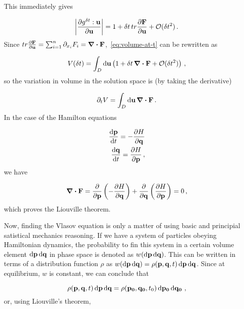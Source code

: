 \documentclass[12pt, class=report, crop=false]{standalone}
\begin{document}
This immediately gives

\begin{equation}
  \abs{\pdv{g^{\delta t}:\vb{u}}{\vb{u}}} = 1 + \delta t\, tr \pdv{\vb{F}}{\vb{u}}+\mathcal{O}(\delta t^2)\,.
\end{equation}
Since \(tr \pdv{\vb{F}}{\vb{u}} = \sum_{i=1}^n \partial_{x_i} F_i = \div{\vb{F}}\),~\cref{eq:volume-at-t} can be rewritten as

\begin{equation}
  V(\delta t) = \int_{D} \dd{\vb{u}} \left( 1+\delta t\, \div{\vb{F}} +\mathcal{O}(\delta t^2) \right)\,,
\end{equation}
so the variation in volume in the solution space is (by taking the derivative)

\begin{equation}
  \partial_t V = \int_{D} \dd{\vb{u}} \div{\vb{F}}\,.
\end{equation}
In the case of the Hamilton equations

\begin{subequations}
  \begin{align}
    \dv{\vb{p}}{t} = - \pdv{H}{\vb{q}}\\
    \dv{\vb{q}}{t} = \pdv{H}{\vb{p}}\,,
  \end{align}
\end{subequations}
we have

\begin{equation}
  \div{\vb{F}} = \pdv{\vb{p}} \left(- \pdv{H}{\vb{q}} \right) + \pdv{\vb{q}} \left(\pdv{H}{\vb{p}} \right) = 0\,,
\end{equation}
which proves the Liouville theorem.

Now, finding the Vlasov equation is only a matter of using basic and principial satistical mechanics reasoning. If we have a system of particles obeying Hamiltonian dynamics, the probability to fin this system in a certain volume element \(\dd{\vb{p}}\dd{\vb{q}}\) in phase space is denoted as \(w(\dd{\vb{p}}\dd{\vb{q}})\). This can be written in terms of a distribution function \(\rho\) as \(w (\dd{\vb{p}} \dd{\vb{q}}) = \rho (\vb{p},\vb{q},t) \dd{\vb{p}} \dd{\vb{q}}\).
Since at equilibrium, \(w\) is constant, we can conclude that

\begin{equation}
  \rho (\vb{p},\vb{q},t) \dd{\vb{p}} \dd{\vb{q}} = \rho (\vb{p_0},\vb{q_0},t_0) \dd{\vb{p_0}} \dd{\vb{q_0}}\,,
\end{equation}
or, using Liouville's theorem,
\end{document}
